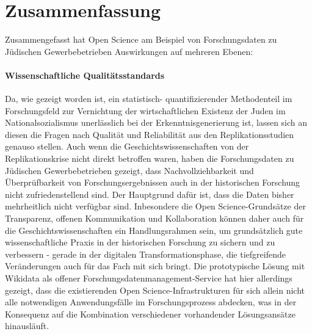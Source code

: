\onehalfspacing

\section{Zusammenfassung}

Zusammengefasst hat Open Science am Beispiel von Forschungsdaten zu Jüdischen Gewerbebetrieben Auswirkungen auf mehreren Ebenen:

\paragraph{Wissenschaftliche Qualitätsstandards} Da, wie gezeigt worden ist, ein statistisch- quantifizierender Methodenteil im Forschungsfeld zur Vernichtung der wirtschaftlichen Existenz der Juden im Nationalsozialismus unerlässlich bei der Erkenntnisgenerierung ist, lassen sich an diesen die Fragen nach Qualität und Reliabilität aus den Replikationsstudien genauso stellen. Auch wenn die Geschichtswissenschaften von der Replikationskrise nicht direkt betroffen waren, haben die Forschungsdaten zu Jüdischen Gewerbebetrieben gezeigt, dass Nachvollziehbarkeit und Überprüfbarkeit von Forschungsergebnissen auch in der historischen Forschung nicht zufriedenstellend sind. Der Hauptgrund dafür ist, dass die Daten bisher mehrheitlich nicht verfügbar sind. Inbesondere die Open Science-Grundsätze der Transparenz, offenen Kommunikation und Kollaboration können daher auch für die Geschichtswissenschaften ein Handlungsrahmen sein, um grundsätzlich gute wissenschaftliche Praxis in der historischen Forschung zu sichern und zu verbessern - gerade in der digitalen Transformationsphase, die tiefgreifende Veränderungen auch für das Fach mit sich bringt. Die prototypische Lösung mit Wikidata als offener Forschungsdatenmanagement-Service hat hier allerdings gezeigt, dass die existierenden Open Science-Infrastrukturen für sich allein nicht alle notwendigen Anwendungsfälle im Forschungsprozess abdecken, was in der Konsequenz auf die Kombination verschiedener vorhandender Lösungsansätze hinausläuft.

